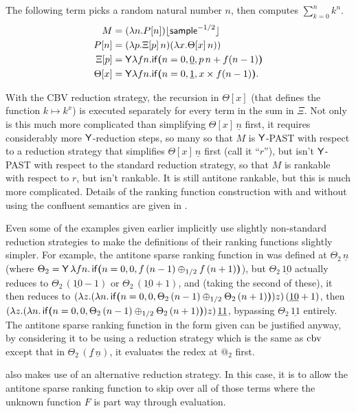 \begin{example} \label{ex:sum of powers}
The following term picks a random natural number $n$, then computes $\sum_{k=0}^n k^n$.
\begin{align*}
M  &= (\lambda n. P[n]) \lfloor \mathsf{sample}^{-1/2} \rfloor \\
P[n]  &= (\lambda p. \Xi[p] \, n) (\lambda x. \Theta[x] \, n)) \\
\Xi[p]  &= \mathsf{Y} \lambda f n. \mathsf{if}\boldsymbol{(}n = 0, \underline 0, p \, n + f (n-1)\boldsymbol{)} \\
\Theta[x]  &= \mathsf{Y} \lambda f n. \mathsf{if}\boldsymbol{(}n = 0, \underline 1, x \times f (n-1)\boldsymbol{)}.
\end{align*}

With the CBV reduction strategy, the recursion in $\Theta[x]$ (that defines the function $k \mapsto k^x$) is executed separately for every term in the sum in $\Xi$. Not only is this much more complicated than simplifying $\Theta[x] \, \underline n$ first, it requires considerably more $\mathsf{Y}$-reduction steps, so many so that $M$ is $\mathsf{Y}$-PAST with respect to a reduction strategy that simplifies $\Theta[x] \, \underline n$ first (call it ``$r$''), but isn't $\mathsf{Y}$-PAST with respect to the standard reduction strategy, so that $M$ is rankable with respect to $r$, but isn't rankable. It is still antitone rankable, but this is much more complicated. Details of the ranking function construction with and without using the confluent semantics are given in .
\end{example}

\begin{remark}
\label{rem:ex corrected using confluent semantics}
Even some of the examples given earlier implicitly use slightly non-standard reduction strategies to make the definitions of their ranking functions slightly simpler. For example, the antitone sparse ranking function in  was defined at $\Theta_2\, \underline n$ (where $\Theta_2 = \mathsf{Y} \, \lambda f n . \, \mathsf{if}\boldsymbol{(}n = 0, 0, f \, (n - 1) \oplus_{1/2} f \, (n + 1)\boldsymbol{)}$), but $\Theta_2\, \underline{10}$ actually reduces to $\Theta_2\, (\underline{10} - 1)$ or $\Theta_2\, (\underline{10} + 1)$, and (taking the second of these), it then reduces to $(\lambda z. (\lambda n. \, \mathsf{if}\boldsymbol{(}n = 0, 0, \Theta_2 \, (n - 1) \oplus_{1/2} \Theta_2 \, (n + 1)\boldsymbol{)}) z) \, (\underline{10} + 1)$, then $(\lambda z. (\lambda n. \, \mathsf{if}\boldsymbol{(}n = 0, 0, \Theta_2 \, (n - 1) \oplus_{1/2} \Theta_2 \, (n + 1)\boldsymbol{)}) z) \, \underline{11}$, bypassing $\Theta_2\, \underline{11}$ entirely. The antitone sparse ranking function in the form given can be justified anyway, by considering it to be using a reduction strategy which is the same as $\operatorname{cbv}$ except that in $\Theta_2\, (\underline f \, \underline n)$, it evaluates the redex at $@_2$ first.

 also makes use of an alternative reduction strategy. In this case, it is to allow the antitone sparse ranking function to skip over all of those terms where the unknown function $F$ is part way through evaluation.
\end{remark}
